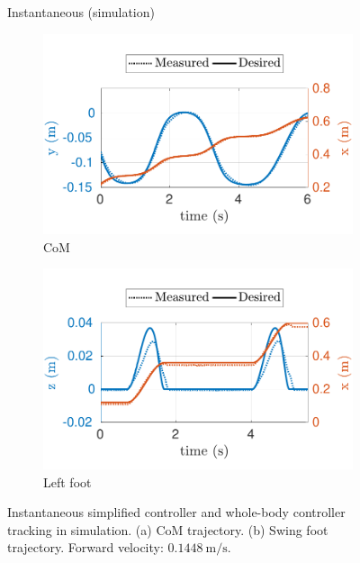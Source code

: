 \begin{figure}[t]
     \begin{myframe}{Instantaneous (simulation)}
    \begin{subfigure}[b]{0.49\textwidth}
        \centering
        \includegraphics[width=\textwidth]{chapter_wbc_benchmarking/figures/inst_torq_sim-min_vel-com.pdf}
        \caption{CoM}
        \label{fig:inst_torq_sim-min_vel-com}
    \end{subfigure}
    \begin{subfigure}[b]{0.49\textwidth}
        \centering
        \includegraphics[width=\textwidth]{chapter_wbc_benchmarking/figures/inst_torq_sim-min_vel-lf.pdf}
        \caption{Left foot}
        \label{fig:inst_torq_sim-min_vel-lf}
    \end{subfigure} 
    \end{myframe}
    \caption[Instantaneous simplified controller and whole-body controller tracking (simulation)]{Instantaneous simplified controller and whole-body controller tracking in simulation. (a) CoM trajectory. (b) Swing foot trajectory. Forward velocity: $\SI{0.1448}{\meter\per\second}$.}
\end{figure}
